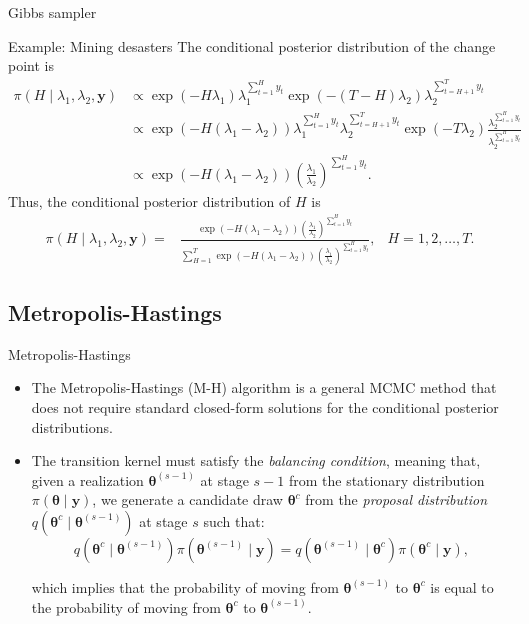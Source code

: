 \documentclass[12pt, compress]{beamer}
\begin{document}
\begin{frame}{Gibbs sampler}
	\begin{block}{Example: Mining desasters}
The conditional posterior distribution of the change point is
{\scriptsize{
\begin{align*}
	\pi(H\mid \lambda_1,\lambda_2,\bm{y})&\propto\exp(-H\lambda_1)\lambda_1^{\sum_{t=1}^H y_t}\exp(-(T-H)\lambda_2)\lambda_2^{\sum_{t=H+1}^T y_t}\\
	&\propto \exp(-H(\lambda_1-\lambda_2))\lambda_1^{\sum_{t=1}^H y_t}\lambda_2^{\sum_{t=H+1}^T y_t} \exp(-T\lambda_2) \frac{\lambda_2^{\sum_{t=1}^H y_t}}{\lambda_2^{\sum_{t=1}^H y_t}}\\
	&\propto \exp(-H(\lambda_1-\lambda_2))\left(\frac{\lambda_1}{\lambda_2}\right)^{\sum_{t=1}^H y_t}.
\end{align*} 
}}
Thus, the conditional posterior distribution of $H$ is
{\scriptsize{
\begin{align*}
	\pi(H\mid \lambda_1,\lambda_2,\bm{y})=& \frac{\exp(-H(\lambda_1-\lambda_2))\left(\frac{\lambda_1}{\lambda_2}\right)^{\sum_{t=1}^H y_t}}{\sum_{H=1}^T \exp(-H(\lambda_1-\lambda_2))\left(\frac{\lambda_1}{\lambda_2}\right)^{\sum_{t=1}^H y_t}}, & H=1,2,\dots,T.
\end{align*}
}}		
\end{block}
\end{frame}
	
\subsection{Metropolis-Hastings}
\begin{frame}{Metropolis-Hastings}
\begin{itemize}
	\item The Metropolis-Hastings (M-H) algorithm \citep{metropolis53,hastings70} is a general MCMC method that does not require standard closed-form solutions for the conditional posterior distributions.
	\item The transition kernel must satisfy the \textit{balancing condition}, meaning that, given a realization $\bm{\theta}^{(s-1)}$ at stage $s-1$ from the stationary distribution $\pi(\bm{\theta} \mid  \bm{y})$, we generate a candidate draw $\bm{\theta}^{c}$ from the \textit{proposal distribution} $q(\bm{\theta}^{c} \mid  \bm{\theta}^{(s-1)})$ at stage $s$ such that:
	\[
	q(\bm{\theta}^{c} \mid  \bm{\theta}^{(s-1)}) \pi(\bm{\theta}^{(s-1)} \mid  \bm{y}) = q(\bm{\theta}^{(s-1)} \mid  \bm{\theta}^{c}) \pi(\bm{\theta}^{c} \mid  \bm{y}),
	\]
	
	which implies that the probability of moving from $\bm{\theta}^{(s-1)}$ to $\bm{\theta}^{c}$ is equal to the probability of moving from $\bm{\theta}^{c}$ to $\bm{\theta}^{(s-1)}$.
\end{itemize}
\end{frame}
\end{document}
